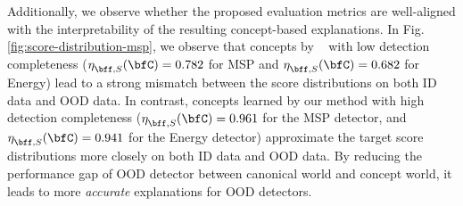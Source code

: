 Additionally, we observe whether the proposed evaluation metrics are well-aligned with the interpretability of the resulting concept-based explanations.
In Fig. \ref{fig:score-distribution-msp}, we observe that concepts by ~\citep{yeh2020completeness} with low detection completeness ($\eta^{}_{\bff, S}(\bfC) = 0.782$ for MSP and $\eta^{}_{\bff, S}(\bfC) = 0.682$ for Energy) lead to a strong mismatch between the score distributions on both ID data and OOD data.
In contrast, concepts learned by our method with high detection completeness ($\eta^{}_{\bff, S}(\bfC) = 0.961$ for the MSP detector, and $\eta^{}_{\bff, S}(\bfC) = 0.941$ for the Energy detector) approximate the target score distributions more closely on both ID data and OOD data.
By reducing the performance gap of OOD detector between canonical world and concept world, it leads to more \textit{accurate} explanations for OOD detectors.

